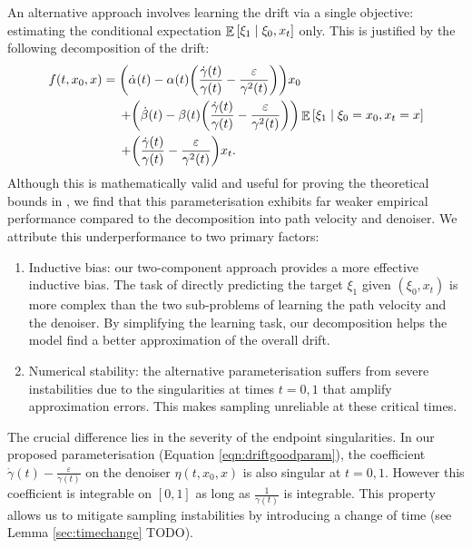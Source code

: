 An alternative approach involves learning the drift via a single objective: estimating the conditional expectation \(\mathop{\mathbb{E}}\qty[\xi_{1} \mid \xi_{0}, x_{t}]\) only. This is justified by the following decomposition of the drift:
\begin{align}
  f(t, x_{0}, x) &=  \qty(\dot{\alpha}(t) - \alpha(t)\qty(\frac{\dot{\gamma}(t)}{\gamma(t)} - \frac{\varepsilon}{\gamma^{2}(t)})) x_{0} \notag\\
  &\mathrel{\phantom{=}}\, + \qty(\dot{\beta}(t) - \beta(t)\qty(\frac{\dot{\gamma}(t)}{\gamma(t)} - \frac{\varepsilon}{\gamma^{2}(t)})) \mathop{\mathbb{E}}\qty[\xi_{1} \mid \xi_{0} = x_{0}, x_{t} = x]\notag \\
  &\mathrel{\phantom{=}}\, + \qty(\frac{\dot{\gamma}(t)}{\gamma(t)} - \frac{\varepsilon}{\gamma^{2}(t)}) x_{t}. \label{eqn:driftbadparam}
\end{align}
Although this is mathematically valid and useful for proving the theoretical bounds in , we find that this parameterisation exhibits far weaker empirical performance compared to the decomposition into path velocity and denoiser. We attribute this underperformance to two primary factors:
\begin{enumerate}
  \item Inductive bias: our two-component approach provides a more effective inductive bias. The task of directly predicting the target \(\xi_{1}\) given \((\xi_{0}, x_{t})\) is more complex than the two sub-problems of learning the path velocity and the denoiser. By simplifying the learning task, our decomposition helps the model find a better approximation of the overall drift.
  \item Numerical stability: the alternative parameterisation suffers from severe instabilities due to the singularities at times \(t = 0 ,1\) that amplify approximation errors. This makes sampling unreliable at these critical times.
\end{enumerate}

The crucial difference lies in the severity of the endpoint singularities. In our proposed parameterisation (Equation \ref{eqn:driftgoodparam}),  the coefficient \(\dot{\gamma}(t) - \frac{\varepsilon}{\gamma(t)}\) on the denoiser \(\eta(t, x_{0}, x)\) is also singular at \(t = 0, 1\). However this coefficient is integrable on \([0, 1]\) as long as \(\frac{1}{\gamma(t)}\) is integrable. This property allows us to mitigate sampling instabilities by introducing a change of time (see Lemma \ref{sec:timechange} TODO).

